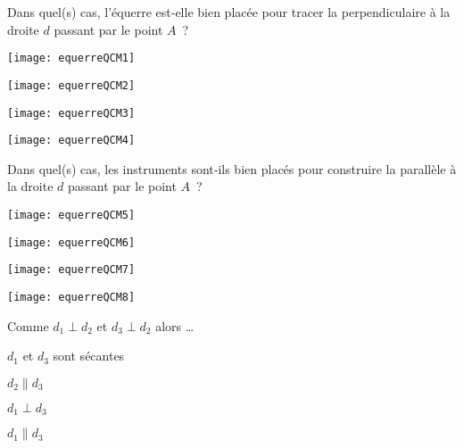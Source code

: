 \begin{QCM}
\begin{GroupeQCM}
    \begin{exercice}
     Dans quel(s) cas, l'équerre est‑elle bien placée pour tracer la perpendiculaire à la droite $d$ passant par le point $A$ ?
      \begin{ChoixQCM}{4}
      \item \texttt{[image: equerreQCM1]}
      \item \texttt{[image: equerreQCM2]}
      \item \texttt{[image: equerreQCM3]}
      \item \texttt{[image: equerreQCM4]}
      \end{ChoixQCM}
\begin{corrige}
   \end{corrige}
    \end{exercice}


    \begin{exercice}
     Dans quel(s) cas, les instruments sont‑ils bien placés pour construire la parallèle à la droite $d$ passant par le point $A$ ?
      \begin{ChoixQCM}{4}
      \item \texttt{[image: equerreQCM5]}
      \item \texttt{[image: equerreQCM6]}
      \item \texttt{[image: equerreQCM7]}
      \item \texttt{[image: equerreQCM8]}
      \end{ChoixQCM}
\begin{corrige}
   \end{corrige}
    \end{exercice}
    
  
    \begin{exercice}
     Comme $d_1 \perp d_2$ et $d_3 \perp d_2$ alors \ldots
      \begin{ChoixQCM}{4}
      \item $d_1$ et $d_3$ sont sécantes
      \item $d_2 \parallel d_3$
      \item $d_1 \perp d_3$
      \item $d_1 \parallel d_3$
      \end{ChoixQCM}
\begin{corrige}
   \end{corrige}
    \end{exercice}
    

\end{GroupeQCM}
\end{QCM}
